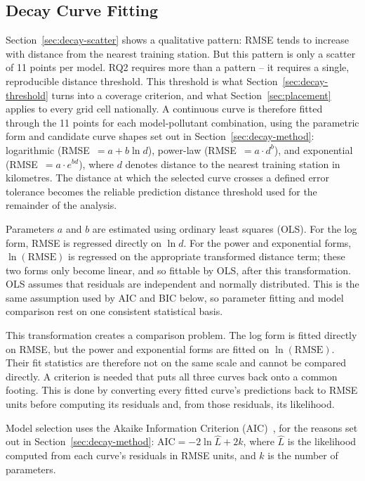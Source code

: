 \documentclass[11pt,a4paper]{article}
\let\oldsubsection\subsection
\renewcommand{\subsection}{\FloatBarrier\oldsubsection}
\begin{document}
\subsection{Decay Curve Fitting}
\label{sec:decay-curves}

Section~\ref{sec:decay-scatter} shows a qualitative pattern: RMSE tends to increase with distance from the nearest training station. But this pattern is only a scatter of 11 points per model. RQ2 requires more than a pattern -- it requires a single, reproducible distance threshold. This threshold is what Section~\ref{sec:decay-threshold} turns into a coverage criterion, and what Section~\ref{sec:placement} applies to every grid cell nationally. A continuous curve is therefore fitted through the 11 points for each model-pollutant combination, using the parametric form and candidate curve shapes set out in Section~\ref{sec:decay-method}: logarithmic (\mbox{RMSE $= a + b \ln d$}), power-law (\mbox{RMSE $= a \cdot d^{b}$}), and exponential (\mbox{RMSE $= a \cdot e^{bd}$}), where $d$ denotes distance to the nearest training station in kilometres. The distance at which the selected curve crosses a defined error tolerance becomes the reliable prediction distance threshold used for the remainder of the analysis.

Parameters $a$ and $b$ are estimated using ordinary least squares (OLS). For the log form, RMSE is regressed directly on $\ln d$. For the power and exponential forms, $\ln(\mathrm{RMSE})$ is regressed on the appropriate transformed distance term; these two forms only become linear, and so fittable by OLS, after this transformation. OLS assumes that residuals are independent and normally distributed. This is the same assumption used by AIC and BIC below, so parameter fitting and model comparison rest on one consistent statistical basis.

This transformation creates a comparison problem. The log form is fitted directly on RMSE, but the power and exponential forms are fitted on $\ln(\mathrm{RMSE})$. Their fit statistics are therefore not on the same scale and cannot be compared directly. A criterion is needed that puts all three curves back onto a common footing. This is done by converting every fitted curve's predictions back to RMSE units before computing its residuals and, from those residuals, its likelihood.

Model selection uses the Akaike Information Criterion (AIC)~\cite{akaike_1974}, for the reasons set out in Section~\ref{sec:decay-method}: $\mathrm{AIC} = -2 \ln \hat{L} + 2k$, where $\hat{L}$ is the likelihood computed from each curve's residuals in RMSE units, and $k$ is the number of parameters.
\end{document}
